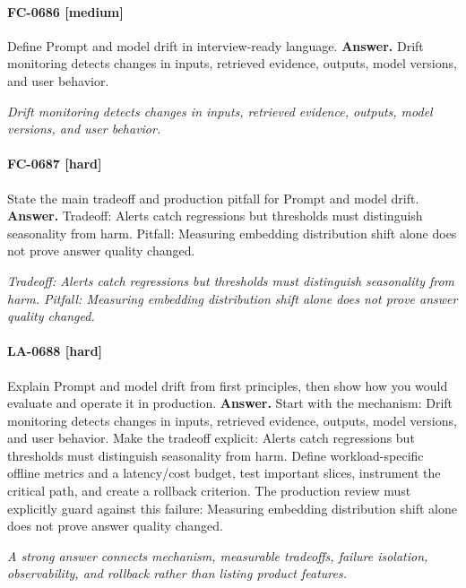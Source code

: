 \paragraph{FC-0686 [medium]} Define Prompt and model drift in interview-ready language.
\noindent\textbf{Answer.} Drift monitoring detects changes in inputs, retrieved evidence, outputs, model versions, and user behavior.
\par\textit{Drift monitoring detects changes in inputs, retrieved evidence, outputs, model versions, and user behavior.}
\paragraph{FC-0687 [hard]} State the main tradeoff and production pitfall for Prompt and model drift.
\noindent\textbf{Answer.} Tradeoff: Alerts catch regressions but thresholds must distinguish seasonality from harm. Pitfall: Measuring embedding distribution shift alone does not prove answer quality changed.
\par\textit{Tradeoff: Alerts catch regressions but thresholds must distinguish seasonality from harm. Pitfall: Measuring embedding distribution shift alone does not prove answer quality changed.}
\paragraph{LA-0688 [hard]} Explain Prompt and model drift from first principles, then show how you would evaluate and operate it in production.
\noindent\textbf{Answer.} Start with the mechanism: Drift monitoring detects changes in inputs, retrieved evidence, outputs, model versions, and user behavior. Make the tradeoff explicit: Alerts catch regressions but thresholds must distinguish seasonality from harm. Define workload-specific offline metrics and a latency/cost budget, test important slices, instrument the critical path, and create a rollback criterion. The production review must explicitly guard against this failure: Measuring embedding distribution shift alone does not prove answer quality changed.
\par\textit{A strong answer connects mechanism, measurable tradeoffs, failure isolation, observability, and rollback rather than listing product features.}
